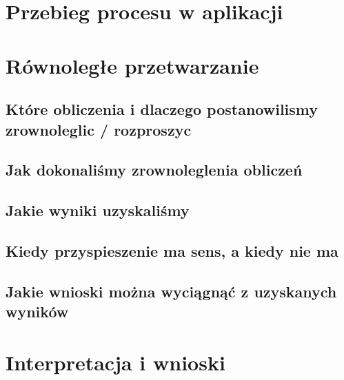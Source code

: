 \documentclass[12pt,a4paper]{article}
\begin{document}
\section{Przebieg procesu w aplikacji}
\section{Równoległe przetwarzanie}
\subsection{Które obliczenia i dlaczego postanowilismy zrownoleglic / rozproszyc}
\subsection{Jak dokonaliśmy zrownoleglenia obliczeń}
\subsection{Jakie wyniki uzyskaliśmy}

\subsection{Kiedy przyspieszenie ma sens, a kiedy nie ma}
\subsection{Jakie wnioski można wyciągnąć z uzyskanych wyników}

\section{Interpretacja i wnioski}

\printbibliography[heading=bibintoc]
\end{document}
